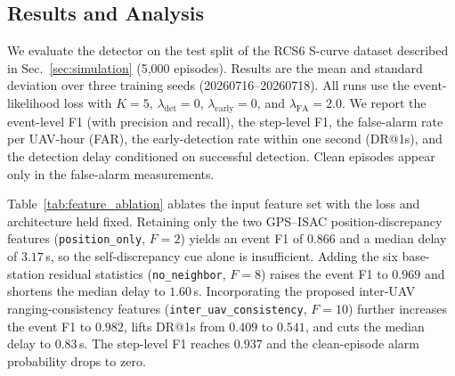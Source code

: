 %

\subsection{Results and Analysis}
\label{sec:results}

We evaluate the detector on the test split of the RCS6 S-curve dataset
described in Sec.~\ref{sec:simulation} (5{,}000 episodes). Results are the
mean and standard deviation over three training seeds (20260716--20260718).
All runs use the event-likelihood loss with $K{=}5$, $\lambda_{\mathrm{det}}{=}0$,
$\lambda_{\mathrm{early}}{=}0$, and $\lambda_{\mathrm{FA}}{=}2.0$. We report
the event-level F1 (with precision and recall), the step-level F1, the
false-alarm rate per UAV-hour (FAR), the early-detection rate within one
second (DR@1s), and the detection delay conditioned on successful detection.
Clean episodes appear only in the false-alarm measurements.

Table~\ref{tab:feature_ablation} ablates the input feature set with the loss
and architecture held fixed. Retaining only the two GPS--ISAC
position-discrepancy features (\texttt{position\_only}, $F{=}2$) yields an
event F1 of $0.866$ and a median delay of $3.17$\,s, so the self-discrepancy
cue alone is insufficient. Adding the six base-station residual statistics
(\texttt{no\_neighbor}, $F{=}8$) raises the event F1 to $0.969$ and shortens
the median delay to $1.60$\,s. Incorporating the proposed inter-UAV
ranging-consistency features (\texttt{inter\_uav\_consistency}, $F{=}10$)
further increases the event F1 to $0.982$, lifts DR@1s from $0.409$ to
$0.541$, and cuts the median delay to $0.83$\,s. The step-level F1 reaches
$0.937$ and the clean-episode alarm probability drops to zero.

